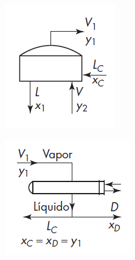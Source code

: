 \documentclass[11pt]{book}
\begin{document}
\begin{figure}
  \begin{subfigure}[b]{0.28\textwidth}
    \includegraphics[width=\textwidth]{img/destilacion/PlatoSuperior_A.PNG}
    \caption{ }
    \label{Fig:PlatoSuperior_A}
  \end{subfigure}
  \hfill
  \begin{subfigure}[b]{0.3\textwidth}
    \includegraphics[width=\textwidth]{img/destilacion/PlatoSuperior_B.PNG}

\end{subfigure}
\end{figure}
\end{document}
